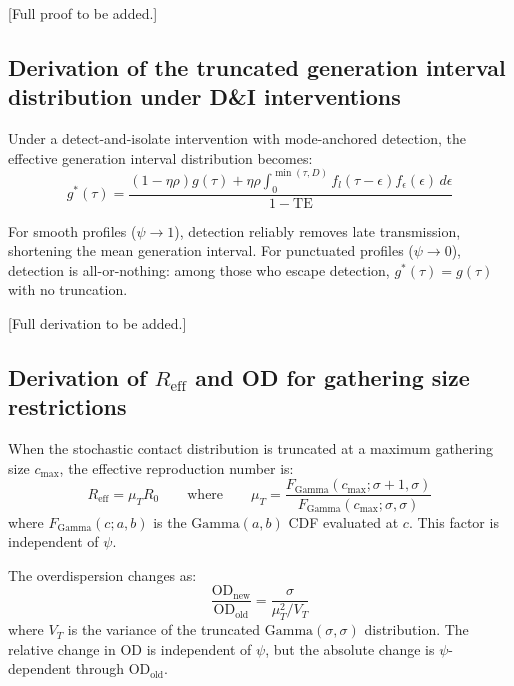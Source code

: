 \documentclass[10pt]{article}
\begin{document}
[Full proof to be added.]


\subsection{Derivation of the truncated generation interval distribution under D\&I interventions}
\label{sec:supp_truncated_gi}

Under a detect-and-isolate intervention with mode-anchored detection, the effective generation interval distribution becomes:
\begin{equation}
g^*(\tau) = \frac{
	(1 - \eta \rho) g(\tau) + \eta \rho \int_0^{\min(\tau,D)} f_l(\tau - \epsilon) f_\epsilon(\epsilon) \, d\epsilon
}{
	1 - \text{TE}
}
\end{equation}

For smooth profiles ($\psi \to 1$), detection reliably removes late transmission, shortening the mean generation interval. For punctuated profiles ($\psi \to 0$), detection is all-or-nothing: among those who escape detection, $g^*(\tau) = g(\tau)$ with no truncation.

[Full derivation to be added.]


\subsection{Derivation of $R_\text{eff}$ and OD for gathering size restrictions}
\label{sec:supp_gathering}

When the stochastic contact distribution is truncated at a maximum gathering size $c_\text{max}$, the effective reproduction number is:
\begin{equation}
	R_\text{eff} = \mu_T R_0 \qquad \text{where} \qquad \mu_T = \frac{F_\text{Gamma}(c_\text{max}; \sigma+1, \sigma)}{F_\text{Gamma}(c_\text{max}; \sigma, \sigma)}
\end{equation}
where $F_\text{Gamma}(c; a, b)$ is the $\text{Gamma}(a, b)$ CDF evaluated at $c$. This factor is independent of $\psi$.

The overdispersion changes as:
\begin{equation}
	\frac{\text{OD}_\text{new}}{\text{OD}_\text{old}} = \frac{\sigma}{\mu_T^2 / V_T}
\end{equation}
where $V_T$ is the variance of the truncated $\text{Gamma}(\sigma,\sigma)$ distribution. The relative change in OD is independent of $\psi$, but the absolute change is $\psi$-dependent through $\text{OD}_\text{old}$.
\end{document}
